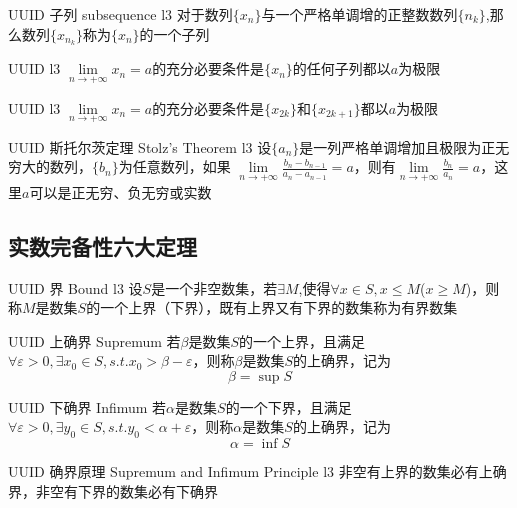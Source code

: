 \documentclass[UTF8, 10pt]{ctexart}
\begin{document}
        \begin{dfn}
            {UUID}
            {子列}
            {subsequence}
            {l3}
            对于数列$\{x_n\}$与一个严格单调增的正整数数列$\{n_k\}$,那么数列$\{x_{n_k}\}$称为$\{x_n\}$的一个子列
        \end{dfn}

        \begin{thm}
            {UUID}
            {}
            {}
            {l3}
            $\lim\limits_{n \to + \infty} x_n =a$的充分必要条件是$\{x_n\}$的任何子列都以$a$为极限
        \end{thm}

        \begin{thm}
            {UUID}
            {}
            {}
            {l3}
             $\lim\limits_{n \to + \infty} x_n =a$的充分必要条件是$\{x_{2k}\}$和$\{x_{2k+1}\}$都以$a$为极限
        \end{thm}

        \begin{thm}
            {UUID}
            {斯托尔茨定理}
            {Stolz's Theorem}
            {l3}
            设$\{a_n\}$是一列严格单调增加且极限为正无穷大的数列，$\{b_n\}$为任意数列，如果 $\lim\limits_{n \to + \infty} \frac{b_n - b_{n-1}}{a_n - a_{n-1}} =a$，则有$\lim\limits_{n \to + \infty} \frac{b_n}{a_n} =a$，这里$a$可以是正无穷、负无穷或实数
        \end{thm}
    \subsection{实数完备性六大定理}
        \begin{dfn}
            {UUID}
            {界}
            {Bound}
            {l3}
            设$S$是一个非空数集，若$\exists M$,使得$\forall x \in S,x\le M$($x\ge M$)，则称$M$是数集$S$的一个上界（下界），既有上界又有下界的数集称为有界数集
        \end{dfn}

        \begin{dfn}
            {UUID}
            {上确界}
            {Supremum}
            若$\beta$是数集$S$的一个上界，且满足$\forall \varepsilon > 0 ,\exists x_0 \in S,s.t.x_0>\beta - \varepsilon$，则称$\beta$是数集$S$的上确界，记为$$\beta = \sup S$$
        \end{dfn}

        \begin{dfn}
            {UUID}
            {下确界}
            {Infimum}
            若$\alpha$是数集$S$的一个下界，且满足$\forall \varepsilon > 0 ,\exists y_0 \in S,s.t.y_0<\alpha + \varepsilon$，则称$\alpha$是数集$S$的上确界，记为$$\alpha = \inf S$$
        \end{dfn}
        \begin{thm}
            {UUID}
            {确界原理}
            {Supremum and Infimum Principle}
            {l3}
            非空有上界的数集必有上确界，非空有下界的数集必有下确界
        \end{thm}
\end{document}
